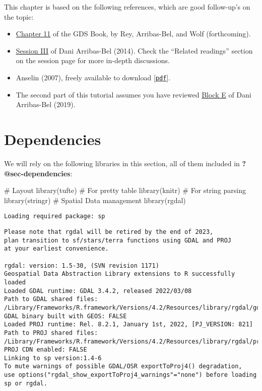 \documentclass[
  letterpaper,
  krantz2]{style/krantz}
\newenvironment{Shaded}{\begin{snugshade}}{\end{snugshade}}
\newcommand{\CommentTok}[1]{\textcolor[rgb]{0.37,0.37,0.37}{#1}}
\newcommand{\FunctionTok}[1]{\textcolor[rgb]{0.28,0.35,0.67}{#1}}
\newcommand{\NormalTok}[1]{\textcolor[rgb]{0.00,0.23,0.31}{#1}}
\providecommand{\tightlist}{%
  \setlength{\itemsep}{0pt}\setlength{\parskip}{0pt}}\usepackage{longtable,booktabs,array}
\begin{document}
This chapter is based on the following references, which are good
follow-up's on the topic:

\begin{itemize}
\tightlist
\item
  \href{https://geographicdata.science/book/notebooks/11_regression.html}{Chapter
  11} of the GDS Book, by Rey, Arribas-Bel, and Wolf (forthcoming).
\item
  \href{http://darribas.org/sdar_mini/notes/Class_03.html}{Session III}
  of Dani Arribas-Bel (2014). Check the ``Related readings'' section on
  the session page for more in-depth discussions.
\item
  Anselin (2007), freely available to download
  {[}\href{https://dces.wisc.edu/wp-content/uploads/sites/128/2013/08/W14_Anselin2007.pdf}{\texttt{pdf}}{]}.
\item
  The second part of this tutorial assumes you have reviewed
  \href{https://darribas.org/gds_course/content/bE/concepts_E.html}{Block
  E} of Dani Arribas-Bel (2019).
\end{itemize}

\hypertarget{dependencies-3}{%
\section{Dependencies}\label{dependencies-3}}

We will rely on the following libraries in this section, all of them
included in \textbf{?@sec-dependencies}:

\begin{Shaded}
\begin{Highlighting}[]
\CommentTok{\# Layout}
\FunctionTok{library}\NormalTok{(tufte)}
\CommentTok{\# For pretty table}
\FunctionTok{library}\NormalTok{(knitr)}
\CommentTok{\# For string parsing}
\FunctionTok{library}\NormalTok{(stringr)}
\CommentTok{\# Spatial Data management}
\FunctionTok{library}\NormalTok{(rgdal)}
\end{Highlighting}
\end{Shaded}

\begin{verbatim}
Loading required package: sp
\end{verbatim}

\begin{verbatim}
Please note that rgdal will be retired by the end of 2023,
plan transition to sf/stars/terra functions using GDAL and PROJ
at your earliest convenience.

rgdal: version: 1.5-30, (SVN revision 1171)
Geospatial Data Abstraction Library extensions to R successfully loaded
Loaded GDAL runtime: GDAL 3.4.2, released 2022/03/08
Path to GDAL shared files: /Library/Frameworks/R.framework/Versions/4.2/Resources/library/rgdal/gdal
GDAL binary built with GEOS: FALSE 
Loaded PROJ runtime: Rel. 8.2.1, January 1st, 2022, [PJ_VERSION: 821]
Path to PROJ shared files: /Library/Frameworks/R.framework/Versions/4.2/Resources/library/rgdal/proj
PROJ CDN enabled: FALSE
Linking to sp version:1.4-6
To mute warnings of possible GDAL/OSR exportToProj4() degradation,
use options("rgdal_show_exportToProj4_warnings"="none") before loading sp or rgdal.
\end{verbatim}
\end{document}
